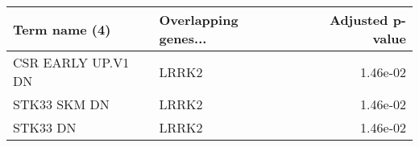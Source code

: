 \begin{tabular}{llr}
\toprule
     Term name (4) & Overlapping genes... &  Adjusted p-value \\
\midrule
CSR EARLY UP.V1 DN &                LRRK2 &          1.46e-02 \\
      STK33 SKM DN &                LRRK2 &          1.46e-02 \\
          STK33 DN &                LRRK2 &          1.46e-02 \\
\bottomrule
\end{tabular}
